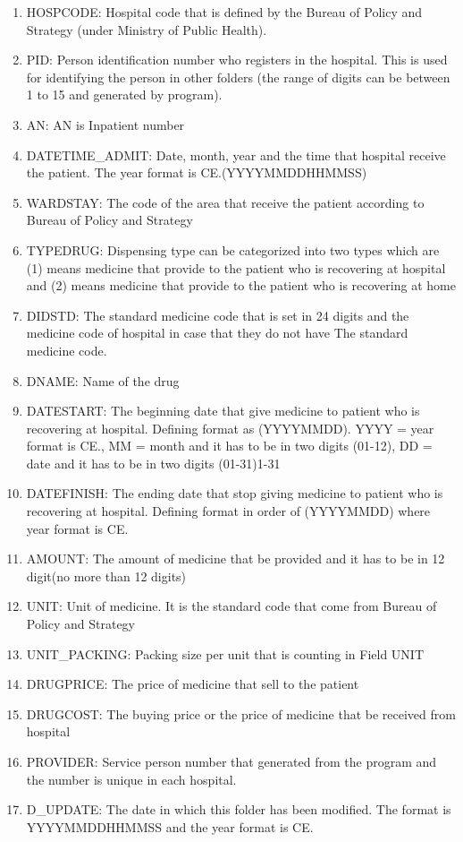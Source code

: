 \begin{enumerate}
  \item HOSPCODE: Hospital code that is defined by the Bureau of Policy and Strategy (under Ministry of Public Health). 
  \item PID: Person identification number who registers in the hospital. This is used for identifying the person in other folders (the range of digits can be between 1 to 15 and generated by program).
  \item AN: AN is Inpatient number
  \item DATETIME\_ADMIT: Date, month, year and the time that hospital receive the patient. The year format is CE.(YYYYMMDDHHMMSS)
  \item WARDSTAY: The code of the area that receive the patient according to Bureau of Policy and Strategy
  \item TYPEDRUG: Dispensing type can be categorized into two types which are (1) means medicine that provide to the patient who is recovering at hospital and (2) means medicine that provide to the patient who is recovering at home
  \item DIDSTD: The standard medicine code that is set in 24 digits and the medicine code of hospital in case that they do not have The standard medicine code.
  \item DNAME: Name of the drug
  \item DATESTART: The beginning date that give medicine to patient who is recovering at hospital. Defining format as (YYYYMMDD). YYYY = year format is CE., MM = month and it has to be in two digits (01-12), DD = date and it has to be in two digits (01-31)1-31
  \item DATEFINISH: The ending date that stop giving medicine to patient who is recovering at hospital. Defining format in order of (YYYYMMDD) where year format is CE.
  \item AMOUNT: The amount of medicine that be provided and it has to be in 12 digit(no more than 12 digits)  
  \item UNIT: Unit of medicine. It is the standard code that come from Bureau of Policy and Strategy  
  \item UNIT\_PACKING: Packing size per unit that is counting in Field UNIT  
  \item DRUGPRICE: The price of medicine that sell to the patient
  \item DRUGCOST: The buying price or the price of medicine that be received from hospital  
  \item PROVIDER: Service person number that generated from the program and the number is unique in each hospital.
  \item D\_UPDATE: The date in which this folder has been modified. The format is YYYYMMDDHHMMSS and the year format is CE.
\end{enumerate}
